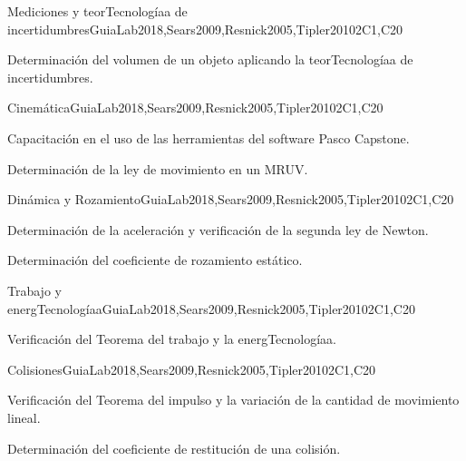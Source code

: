 \begin{syllabus}
\begin{competences}
    \item {}
\end{competences}

\begin{unit}{Mediciones y teorTecnologíaa de incertidumbres}{}{GuiaLab2018,Sears2009,Resnick2005,Tipler2010}{2}{C1,C20}
\begin{topics}
      \item Determinación del volumen de un objeto aplicando la teorTecnologíaa de incertidumbres.
\end{topics}
\end{unit}

\begin{unit}{Cinemática}{}{GuiaLab2018,Sears2009,Resnick2005,Tipler2010}{2}{C1,C20}
\begin{topics}
      \item Capacitación en el uso de las herramientas del software Pasco Capstone.
      \item Determinación de la ley de movimiento en un MRUV.
\end{topics}
\end{unit}

\begin{unit}{Dinámica y Rozamiento}{}{GuiaLab2018,Sears2009,Resnick2005,Tipler2010}{2}{C1,C20}
\begin{topics}
      \item Determinación de la aceleración y verificación de la segunda ley de Newton. 
      \item Determinación del coeficiente de rozamiento estático.
\end{topics}
\end{unit}

\begin{unit}{Trabajo y energTecnologíaa}{}{GuiaLab2018,Sears2009,Resnick2005,Tipler2010}{2}{C1,C20}
\begin{topics}
      \item Verificación del Teorema del trabajo y la energTecnologíaa.
   \end{topics}
\end{unit}

\begin{unit}{Colisiones}{}{GuiaLab2018,Sears2009,Resnick2005,Tipler2010}{2}{C1,C20}
\begin{topics}
	\item Verificación del Teorema del impulso y la variación de la cantidad de movimiento lineal. 
	\item Determinación del coeficiente de restitución de una colisión.
   \end{topics}
\end{unit}


\end{syllabus}
